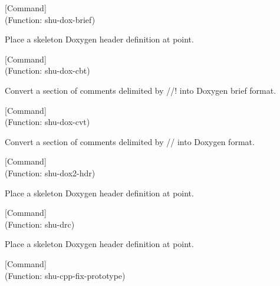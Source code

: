 \vspace{1em}
\noindent
{}
\usebox{\funcname}
 \hfill [Command]\\%
 (Function: shu-dox-brief)

\begin{doc-string}
Place a skeleton Doxygen header definition at point.
\end{doc-string}

\vspace{1em}
\noindent
{}
\usebox{\funcname}
 \hfill [Command]\\%
 (Function: shu-dox-cbt)

\begin{doc-string}
Convert a section of comments delimited by //! into Doxygen brief format.
\end{doc-string}

\vspace{1em}
\noindent
{}
\usebox{\funcname}
 \hfill [Command]\\%
 (Function: shu-dox-cvt)

\begin{doc-string}
Convert a section of comments delimited by // into Doxygen format.
\end{doc-string}

\vspace{1em}
\noindent
{}
\usebox{\funcname}
 \hfill [Command]\\%
 (Function: shu-dox2-hdr)

\begin{doc-string}
Place a skeleton Doxygen header definition at point.
\end{doc-string}

\vspace{1em}
\noindent
{}
\usebox{\funcname}
 \hfill [Command]\\%
 (Function: shu-drc)

\begin{doc-string}
Place a skeleton Doxygen header definition at point.
\end{doc-string}

\vspace{1em}
\noindent
{}
\usebox{\funcname}
 \hfill [Command]\\%
 (Function: shu-cpp-fix-prototype)

